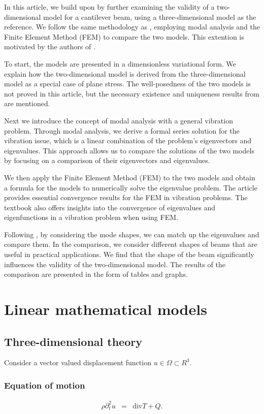 In this article, we build upon \cite{LVV09} by further examining the validity of a two-dimensional model for a cantilever beam, using a three-dimensional model as the reference. We follow the same methodology as \cite{LVV09}, employing modal analysis and the Finite Element Method (FEM) to compare the two models. This extention is motivated by the authors of \cite{LVV09}.

To start, the models are presented in a dimensionless variational form. We explain how the two-dimensional model is derived from the three-dimensional model as a special case of plane stress. The well-posedness of the two models is not proved in this article, but the necessary existence and uniqueness results from \cite{VV02} are mentioned.

Next we introduce the concept of modal analysis with a general vibration problem. Through modal analysis, we derive a formal series solution for the vibration issue, which is a linear combination of the problem's eigenvectors and eigenvalues. This approach allows us to compare the solutions of the two models by focusing on a comparison of their eigenvectors and eigenvalues.

We then apply the Finite Element Method (FEM) to the two models and obtain a formula for the models to numerically solve the eigenvalue problem. The article \cite{BV13} provides essential convergence results for the FEM in vibration problems. The textbook \cite{SF73} also offers insights into the convergence of eigenvalues and eigenfunctions in a vibration problem when using FEM. 

Following \cite{LVV09}, by considering the mode shapes, we can match up the eigenvalues and compare them. In the comparison, we consider different shapes of beams that are useful in practical applications. We find that the shape of the beam significantly influences the validity of the two-dimensional model. The results of the comparison are presented in the form of tables and graphs.

\section{Linear mathematical models}
	\subsection{Three-dimensional theory}
		Consider a vector valued displacement function $u \in \Omega \subset R^3$.

		\subsubsection*{Equation of motion}\label{ssec:3D_Model:EquationOfMotion}
		\begin{eqnarray}
			\rho\partial_t^2 u & = & \textrm{div}T + Q. \label{eq:3D_Model:EM}
		\end{eqnarray} \label{sym:rho} \label{sym:partial_diff} \label{sym:T} \label{sym:Q}

